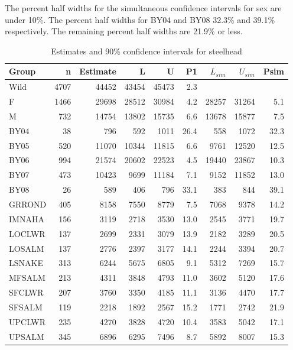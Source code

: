 \documentclass[12pt]{article}
\begin{document}
The percent half widths for the simultaneous confidence intervals for sex are under 10\%.  The percent half widths for BY04 and BY08 32.3\% and 39.1\% respectively. The remaining percent half widths are 21.9\% or less.

\begin{table}
\caption{Estimates and 90\% confidence intervals for steelhead}
\label{table:SHresults90} 
\begin{center}
\begin{tabular}{|l|r|r|r|r|r|r|r|r|}
\hline Group &n& Estimate & L & U & P1 & $L_{sim}$ & $U_{sim}$ & Psim \\ 
\hline  Wild&4707&44452  &43454  &45473  & 2.3  & & &  \\ 
\hline  F&1466&29698&28512&30984&4.2&28257&31264&5.1  \\
\hline  M&732&14754&13802&15735&6.6&13678&15877&7.5  \\
\hline  BY04&38&796&592&1011&26.4&558&1072&32.3  \\
\hline  BY05&520&11070&10344&11815&6.6&9761&12520&12.5  \\
\hline  BY06&994&21574&20602&22523&4.5&19440&23867&10.3  \\
\hline  BY07&473&10423&9699&11184&7.1&9152&11852&13.0  \\
\hline  BY08&26&589&406&796&33.1&383&844&39.1  \\
\hline  GRROND &405&8158 &7550 &8779 &7.5  &7068 &9378 &14.2  \\ 
\hline  IMNAHA &156&3119 &2718 &3530 &13.0  &2545 &3771 &19.7  \\ 
\hline  LOCLWR &137&2699 &2331 &3079 &13.9  &2182 &3289 &20.5  \\ 
\hline  LOSALM &137&2776 &2397 &3177 &14.1  &2244 &3394 &20.7  \\ 
\hline  LSNAKE &313&6244 &5675 &6805 &9.1  &5312 &7269 &15.7  \\ 
\hline  MFSALM &213&4311 &3848 &4793 &11.0  &3602 &5120 &17.6  \\ 
\hline  SFCLWR &207&3760 &3350 &4185 &11.1  &3136 &4470 &17.7  \\ 
\hline  SFSALM &119&2218 &1892 &2567 &15.2  &1771 &2742 &21.9  \\ 
\hline  UPCLWR &235&4270 &3828 &4720 &10.4  &3583 &5042 &17.1  \\ 
\hline  UPSALM &345&6896 &6295 &7496 &8.7  &5892 &8007 &15.3  \\
\hline 
\end{tabular}
\end{center}
\end{table}
\end{document}
